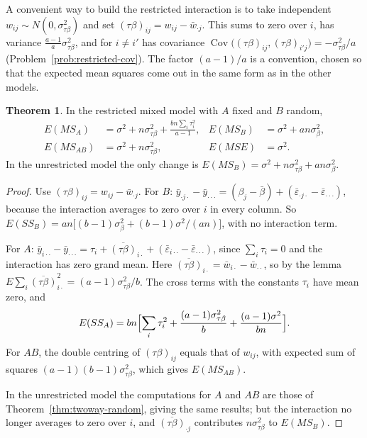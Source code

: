 \documentclass[11pt,a4paper]{article}
\numberwithin{equation}{section}
\DeclareMathOperator{\Cov}{Cov}
\theoremstyle{definition}
\newtheorem{thm}{Theorem}[subsection]
\begin{document}
A convenient way to build the restricted interaction is to take independent $w_{ij} \sim N(0, \sigma^2_{\tau\beta})$ and set $(\tau\beta)_{ij} = w_{ij} - \bar w_{\cdot j}$. This sums to zero over $i$, has variance
$\frac{a - 1}a\sigma^2_{\tau\beta}$, and for $i \ne i'$ has covariance $\Cov\bigl((\tau\beta)_{ij}, (\tau\beta)_{i'j}\bigr) = -\sigma^2_{\tau\beta}/a$ (Problem~\ref{prob:restricted-cov}). The factor $(a - 1)/a$ is a
convention, chosen so that the expected mean squares come out in the same form as in the other models.

\begin{thm}\label{thm:mixed}
In the restricted mixed model with $A$ fixed and $B$ random,
\begin{align*}
E(MS_A) &= \sigma^2 + n\sigma^2_{\tau\beta} + \frac{bn\sum_i\tau_i^2}{a - 1} , & E(MS_B) &= \sigma^2 + an\sigma^2_\beta , \\
E(MS_{AB}) &= \sigma^2 + n\sigma^2_{\tau\beta} , & E(MSE) &= \sigma^2 .
\end{align*}
In the unrestricted model the only change is $E(MS_B) = \sigma^2 + n\sigma^2_{\tau\beta} + an\sigma^2_\beta$.
\end{thm}

\begin{proof}
Use $(\tau\beta)_{ij} = w_{ij} - \bar w_{\cdot j}$. For $B$: $\bar y_{\cdot j\cdot} - \bar y_{\cdot\cdot\cdot} = (\beta_j - \bar\beta) + (\bar\varepsilon_{\cdot j\cdot} - \bar\varepsilon_{\cdot\cdot\cdot})$, because the interaction averages to zero over $i$ in every
column. So $E(SS_B) = an\bigl[(b - 1)\sigma^2_\beta + (b - 1)\sigma^2/(an)\bigr]$, with no interaction term.

For $A$: $\bar y_{i\cdot\cdot} - \bar y_{\cdot\cdot\cdot} = \tau_i + \overline{(\tau\beta)}_{i\cdot} + (\bar\varepsilon_{i\cdot\cdot} - \bar\varepsilon_{\cdot\cdot\cdot})$, since $\sum_i\tau_i = 0$ and the interaction has zero grand mean. Here $\overline{(\tau\beta)}_{i\cdot} = \bar w_{i\cdot} - \bar w_{\cdot\cdot}$,
so by the lemma $E\sum_i\overline{(\tau\beta)}_{i\cdot}^2 = (a - 1)\sigma^2_{\tau\beta}/b$. The cross terms with the constants $\tau_i$ have mean zero, and
\[
E(SS_A) = bn\Bigl[\sum_i\tau_i^2 + \frac{(a - 1)\sigma^2_{\tau\beta}}b + \frac{(a - 1)\sigma^2}{bn}\Bigr] .
\]
For $AB$, the double centring of $(\tau\beta)_{ij}$ equals that of $w_{ij}$, with expected sum of squares $(a - 1)(b - 1)\sigma^2_{\tau\beta}$, which gives $E(MS_{AB})$.

In the unrestricted model the computations for $A$ and $AB$ are those of Theorem~\ref{thm:twoway-random}, giving the same results; but the interaction no
longer averages to zero over $i$, and $\overline{(\tau\beta)}_{\cdot j}$ contributes $n\sigma^2_{\tau\beta}$ to $E(MS_B)$.
\end{proof}
\end{document}
